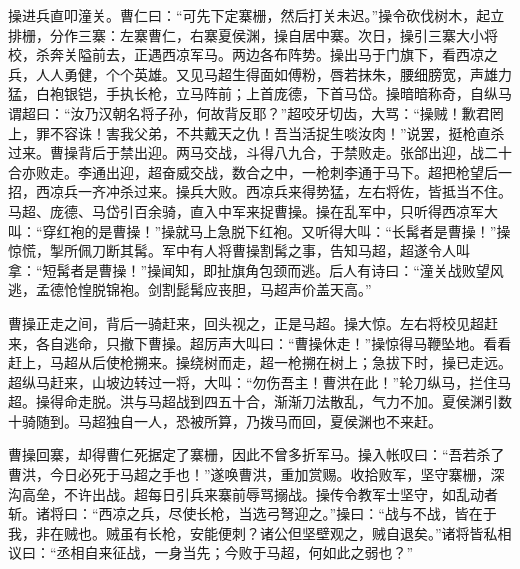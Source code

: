 操进兵直叩潼关。曹仁曰：“可先下定寨栅，然后打关未迟。”操令砍伐树木，起立排栅，分作三寨：左寨曹仁，右寨夏侯渊，操自居中寨。次日，操引三寨大小将校，杀奔关隘前去，正遇西凉军马。两边各布阵势。操出马于门旗下，看西凉之兵，人人勇健，个个英雄。又见马超生得面如傅粉，唇若抹朱，腰细膀宽，声雄力猛，白袍银铠，手执长枪，立马阵前；上首庞德，下首马岱。操暗暗称奇，自纵马谓超曰：“汝乃汉朝名将子孙，何故背反耶？”超咬牙切齿，大骂：“操贼！歉君罔上，罪不容诛！害我父弟，不共戴天之仇！吾当活捉生啖汝肉！”说罢，挺枪直杀过来。曹操背后于禁出迎。两马交战，斗得八九合，于禁败走。张郃出迎，战二十合亦败走。李通出迎，超奋威交战，数合之中，一枪刺李通于马下。超把枪望后一招，西凉兵一齐冲杀过来。操兵大败。西凉兵来得势猛，左右将佐，皆抵当不住。马超、庞德、马岱引百余骑，直入中军来捉曹操。操在乱军中，只听得西凉军大叫：“穿红袍的是曹操！”操就马上急脱下红袍。又听得大叫：“长髯者是曹操！”操惊慌，掣所佩刀断其髯。军中有人将曹操割髯之事，告知马超，超遂令人叫拿：“短髯者是曹操！”操闻知，即扯旗角包颈而逃。后人有诗曰：“潼关战败望风逃，孟德怆惶脱锦袍。剑割髭髯应丧胆，马超声价盖天高。”

曹操正走之间，背后一骑赶来，回头视之，正是马超。操大惊。左右将校见超赶来，各自逃命，只撤下曹操。超厉声大叫曰：“曹操休走！”操惊得马鞭坠地。看看赶上，马超从后使枪搠来。操绕树而走，超一枪搠在树上；急拔下时，操已走远。超纵马赶来，山坡边转过一将，大叫：“勿伤吾主！曹洪在此！”轮刀纵马，拦住马超。操得命走脱。洪与马超战到四五十合，渐渐刀法散乱，气力不加。夏侯渊引数十骑随到。马超独自一人，恐被所算，乃拨马而回，夏侯渊也不来赶。

曹操回寨，却得曹仁死据定了寨栅，因此不曾多折军马。操入帐叹曰：“吾若杀了曹洪，今日必死于马超之手也！”遂唤曹洪，重加赏赐。收拾败军，坚守寨栅，深沟高垒，不许出战。超每日引兵来寨前辱骂搦战。操传令教军士坚守，如乱动者斩。诸将曰：“西凉之兵，尽使长枪，当选弓弩迎之。”操曰：“战与不战，皆在于我，非在贼也。贼虽有长枪，安能便刺？诸公但坚壁观之，贼自退矣。”诸将皆私相议曰：“丞相自来征战，一身当先；今败于马超，何如此之弱也？”

